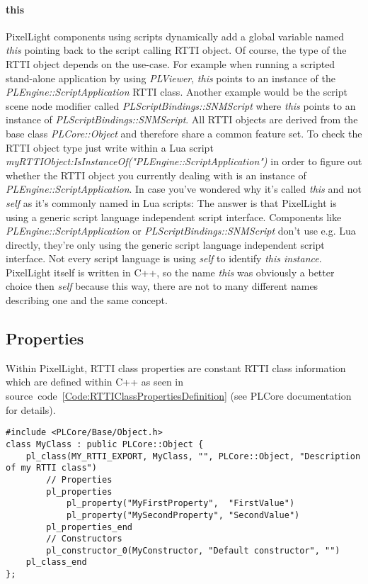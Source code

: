 \paragraph{this}
PixelLight components using scripts dynamically add a global variable named \emph{this} pointing back to the script calling RTTI object. Of course, the type of the RTTI object depends on the use-case. For example when running a scripted stand-alone application by using \emph{PLViewer}, \emph{this} points to an instance of the \emph{PLEngine::ScriptApplication} RTTI class. Another example would be the script scene node modifier called \emph{PLScriptBindings::SNMScript} where \emph{this} points to an instance of \emph{PLScriptBindings::SNMScript}. All RTTI objects are derived from the base class \emph{PLCore::Object} and therefore share a common feature set. To check the RTTI object type just write within a Lua script \emph{myRTTIObject:IsInstanceOf("PLEngine::ScriptApplication")} in order to figure out whether the RTTI object you currently dealing with is an instance of \emph{PLEngine::ScriptApplication}. In case you've wondered why it's called \emph{this} and not \emph{self} as it's commonly named in Lua scripts: The answer is that PixelLight is using a generic script language independent script interface. Components like \emph{PLEngine::ScriptApplication} or \emph{PLScriptBindings::SNMScript} don't use e.g. Lua directly, they're only using the generic script language independent script interface. Not every script language is using \emph{self} to identify \emph{this instance}. PixelLight itself is written in C++, so the name \emph{this} was obviously a better choice then \emph{self} because this way, there are not to many different names describing one and the same concept.


\subsection{Properties}
Within PixelLight, RTTI class properties are constant RTTI class information which are defined within C++ as seen in source~code~\ref{Code:RTTIClassPropertiesDefinition} (see PLCore documentation for details).
\begin{lstlisting}[label=Code:RTTIClassPropertiesDefinition,caption={Defining a new RTTI class with properties (C++)}]
#include <PLCore/Base/Object.h>
class MyClass : public PLCore::Object {
	pl_class(MY_RTTI_EXPORT, MyClass, "", PLCore::Object, "Description of my RTTI class")
		// Properties
		pl_properties
			pl_property("MyFirstProperty",  "FirstValue")
			pl_property("MySecondProperty", "SecondValue")
		pl_properties_end
		// Constructors
		pl_constructor_0(MyConstructor, "Default constructor", "")
	pl_class_end
};
\end{lstlisting}

